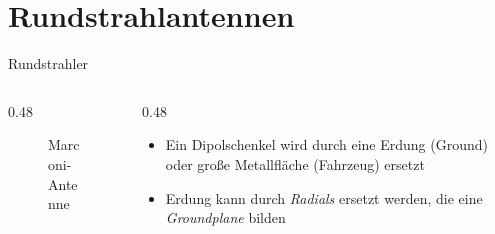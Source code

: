 \section{Rundstrahlantennen}
\label{section:rundstrahler}
\begin{frame}{Rundstrahler}
    \begin{columns}
        \begin{column}{0.48\textwidth}
            \begin{figure}
                \caption{\scriptsize Marconi-Antenne}
                \label{n_marconi_antenne}
            \end{figure}
        \end{column}
        \begin{column}{0.48\textwidth}
            \begin{itemize}[<+->]
                \item Ein Dipolschenkel wird durch eine Erdung (Ground) oder große Metallfläche (Fahrzeug) ersetzt
                \item Erdung kann durch \emph{Radials} ersetzt werden, die eine \emph{Groundplane} bilden
            \end{itemize}
        \end{column}
    \end{columns}
\end{frame}

\begin{frame}
\end{frame}

